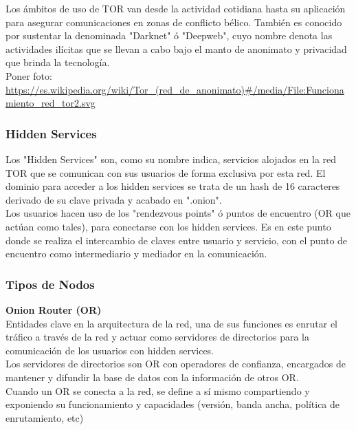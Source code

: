 Los ámbitos de uso de TOR van desde la actividad cotidiana hasta su aplicación para asegurar comunicaciones en zonas de conflicto bélico. También es conocido por sustentar la denominada "Darknet" ó "Deepweb", cuyo nombre denota las actividades ilícitas que se llevan a cabo bajo el manto de anonimato y privacidad que brinda la tecnología. \\

Poner foto: \url {https://es.wikipedia.org/wiki/Tor_(red_de_anonimato)#/media/File:Funcionamiento_red_tor2.svg}

\subsubsection {Hidden Services}

Los "Hidden Services" son, como su nombre indica, servicios alojados en la red TOR que se comunican con sus usuarios de forma exclusiva por esta red. El dominio para acceder a los hidden services se trata de un hash de 16 caracteres derivado de su clave privada y acabado en ".onion". \\

Los usuarios hacen uso de los "rendezvous points" ó puntos de encuentro (OR que actúan como tales), para conectarse con los hidden services. Es en este punto donde se realiza el intercambio de claves entre usuario y servicio, con el punto de encuentro como intermediario y mediador en la comunicación. \\ 


\subsubsection {Tipos de Nodos}

\textbf {Onion Router (OR)} \\
Entidades clave en la arquitectura de la red, una de sus funciones es enrutar el tráfico a través de la red y actuar como servidores de directorios para la comunicación de los usuarios con hidden services. \\ Los servidores de directorios son OR con operadores de confianza, encargados de mantener y difundir la base de datos con la información de otros OR. \\

Cuando un OR se conecta a la red, se define a sí mismo compartiendo y exponiendo su funcionamiento y capacidades (versión, banda ancha, política de enrutamiento, etc) \\


